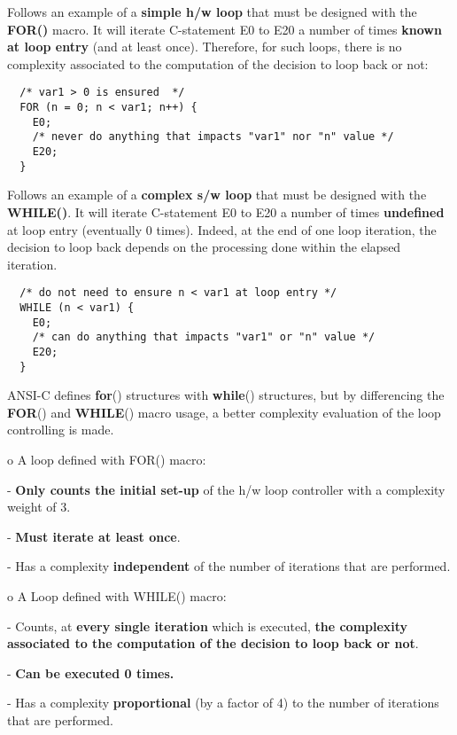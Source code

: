 \begin{list}{o}
 \item Follows an example of a \textbf{simple h/w loop} that must
  be designed with the \textbf{FOR()} macro. It will iterate
  C-statement E0 to E20 a number of times \textbf{known at loop
  entry} (and at least once). Therefore, for such loops, there is no
  complexity associated to the computation of the decision to loop
  back or not:
  {\small
  \begin{verbatim}
  /* var1 > 0 is ensured  */
  FOR (n = 0; n < var1; n++) {
    E0;
    /* never do anything that impacts "var1" nor "n" value */
    E20;
  }
  \end{verbatim}}

 \item Follows an example of a \textbf{complex s/w loop} that must be
         designed with the \textbf{WHILE()}. It will iterate C-statement E0 to
         E20 a number of times \textbf{undefined} at loop entry (eventually 0
         times). Indeed, at the end of one loop iteration, the decision to loop
         back depends on the processing done within the elapsed iteration. 
  {\small
  \begin{verbatim}
  /* do not need to ensure n < var1 at loop entry */
  WHILE (n < var1) {
    E0;
    /* can do anything that impacts "var1" or "n" value */
    E20;
  }
  \end{verbatim}}
\end{list}

 ANSI-C defines \textbf{for}() structures with \textbf{while}()
 structures, but by differencing the \textbf{FOR}() and
 \textbf{WHILE}() macro usage, a better complexity evaluation of
 the loop controlling is made. 

 \begin{list}{}
 \item o A loop defined with FOR() macro: 
  \begin{list}{}
   \item - \textbf{Only counts the initial set-up} of the h/w loop controller with a complexity weight of 3. 
   \item - \textbf{Must iterate at least once}. 
   \item - Has a complexity \textbf{independent} of the number of iterations that are performed.
  \end{list}
 \item o A Loop defined with WHILE() macro: 
  \begin{list}{}
   \item - Counts, at \textbf{every single iteration} which is executed,
\textbf{the complexity associated to the computation of the
decision to loop back or not}.
   \item - \textbf{Can be executed 0 times.}
   \item - Has a complexity \textbf{proportional} (by a factor
of  4) to the number of iterations that are performed.
  \end{list}
\end{list}

